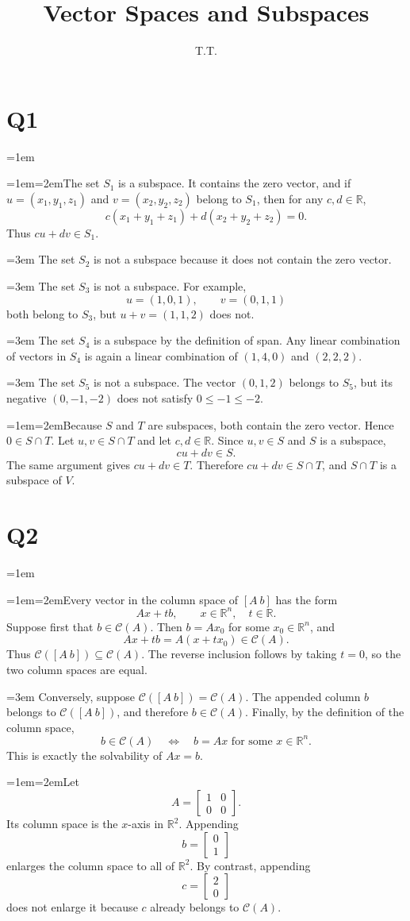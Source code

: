\documentclass[11pt]{article}
\title{Vector Spaces and Subspaces}\author{T.T.}\date{}
\newcommand{\solutionquestion}[1]{\par\leftskip=0pt\section*{Q#1}\leftskip=1em}
\newcommand{\solutionpart}[1]{\par\smallskip\leftskip=1em\noindent\hangindent=2em\hangafter=1\makebox[1.5em][l]{\textbf{(#1)}}\hspace{0.5em}\ignorespaces}
\newcommand{\solutioncontinuation}{\par\leftskip=3em\noindent\ignorespaces}
\begin{document}
\maketitle

\solutionquestion{1}
\solutionpart{i}The set $S_1$ is a subspace. It contains the zero vector, and if $u=(x_1,y_1,z_1)$ and $v=(x_2,y_2,z_2)$ belong to $S_1$, then for any $c,d\in\mathbb R$,
\[
c(x_1+y_1+z_1)+d(x_2+y_2+z_2)=0.
\]
Thus $cu+dv\in S_1$.

\solutioncontinuation{} The set $S_2$ is not a subspace because it does not contain the zero vector.

\solutioncontinuation{} The set $S_3$ is not a subspace. For example,
\[
u=(1,0,1),\qquad v=(0,1,1)
\]
both belong to $S_3$, but $u+v=(1,1,2)$ does not.

\solutioncontinuation{} The set $S_4$ is a subspace by the definition of span. Any linear combination of vectors in $S_4$ is again a linear combination of $(1,4,0)$ and $(2,2,2)$.

\solutioncontinuation{} The set $S_5$ is not a subspace. The vector $(0,1,2)$ belongs to $S_5$, but its negative $(0,-1,-2)$ does not satisfy $0\leq-1\leq-2$.

\solutionpart{ii}Because $S$ and $T$ are subspaces, both contain the zero vector. Hence $0\in S\cap T$. Let $u,v\in S\cap T$ and let $c,d\in\mathbb R$. Since $u,v\in S$ and $S$ is a subspace,
\[
cu+dv\in S.
\]
The same argument gives $cu+dv\in T$. Therefore $cu+dv\in S\cap T$, and $S\cap T$ is a subspace of $V$.

\solutionquestion{2}
\solutionpart{i}Every vector in the column space of $[A\ b]$ has the form
\[
Ax+tb,
\qquad x\in\mathbb R^n,\quad t\in\mathbb R.
\]
Suppose first that $b\in\mathcal C(A)$. Then $b=Ax_0$ for some $x_0\in\mathbb R^n$, and
\[
Ax+tb=A(x+tx_0)\in\mathcal C(A).
\]
Thus $\mathcal C([A\ b])\subseteq\mathcal C(A)$. The reverse inclusion follows by taking $t=0$, so the two column spaces are equal.

\solutioncontinuation{} Conversely, suppose $\mathcal C([A\ b])=\mathcal C(A)$. The appended column $b$ belongs to $\mathcal C([A\ b])$, and therefore $b\in\mathcal C(A)$. Finally, by the definition of the column space,
\[
b\in\mathcal C(A)
\quad\Longleftrightarrow\quad
b=Ax\text{ for some }x\in\mathbb R^n.
\]
This is exactly the solvability of $Ax=b$.

\solutionpart{ii}Let
\[
A=\begin{bmatrix}1&0\\0&0\end{bmatrix}.
\]
Its column space is the $x$-axis in $\mathbb R^2$. Appending
\[
b=\begin{bmatrix}0\\1\end{bmatrix}
\]
enlarges the column space to all of $\mathbb R^2$. By contrast, appending
\[
c=\begin{bmatrix}2\\0\end{bmatrix}
\]
does not enlarge it because $c$ already belongs to $\mathcal C(A)$.
\end{document}
